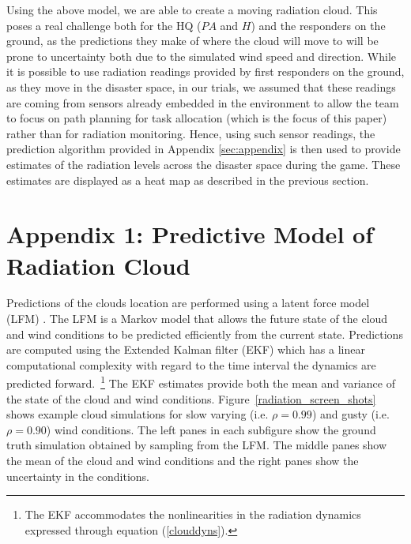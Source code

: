 Using the above model, we are able to create a moving radiation cloud. This poses a real challenge both for the HQ ($PA$ and $H$) and the responders on the ground, as the predictions they make of where the cloud will move to will be prone to uncertainty both due to the simulated wind speed and direction.  While it is possible to use radiation readings provided by first responders on the ground, as they move in the disaster space, in our trials, we assumed that these readings are coming from sensors already embedded in the environment to allow the team to focus on path planning for task allocation (which is the focus of this paper) rather than for radiation monitoring. Hence, using such sensor readings, the prediction algorithm provided in Appendix \ref{sec:appendix} is then used to provide estimates of the radiation levels across  the disaster space during the game. These estimates are displayed as a heat map as described in the previous section.

\section*{Appendix 1: Predictive Model of Radiation Cloud}\label{sec:appendix}

Predictions of the clouds location are performed using a latent force model (LFM) \cite{reece10,reece14}.  The LFM is a Markov model that allows the future state of the cloud and wind conditions to be predicted efficiently from the current state.  Predictions are computed using the Extended Kalman filter (EKF) which has a linear computational complexity with regard to the time interval the dynamics are predicted forward.~\footnote{The EKF accommodates the nonlinearities in the radiation dynamics expressed through equation (\ref{clouddyns}).}  The EKF estimates provide both the mean and variance of the state of the cloud and wind conditions.  Figure~\ref{radiation_screen_shots} shows example cloud simulations for slow varying (i.e. $\rho=0.99$) and gusty (i.e. $\rho=0.90$) wind conditions.  The left panes in each subfigure show the ground truth simulation obtained by sampling from the LFM.  The middle panes show the mean of the cloud and wind conditions and the right panes show the uncertainty in the conditions.

